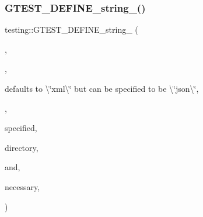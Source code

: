 \subsubsection{\texorpdfstring{GTEST\_DEFINE\_string\_()}{GTEST\_DEFINE\_string\_()}\hspace{0.1cm}{\footnotesize\ttfamily [4/5]}}
{\footnotesize\ttfamily testing\+::\+G\+T\+E\+S\+T\+\_\+\+D\+E\+F\+I\+N\+E\+\_\+string\+\_\+ (\begin{DoxyParamCaption}\item[{output}]{,  }\item[{\mbox{\hyperlink{namespacetesting_1_1internal_a7ed785df46a339403b0f749d3a879201}{internal\+::\+String\+From\+G\+Test\+Env}}(\char`\"{}output\char`\"{}, internal\+::\+Output\+Flag\+Also\+Check\+Env\+Var().c\+\_\+str())}]{,  }\item[{\char`\"{}A format }]{defaults to \textbackslash{}\char`\"{}xml\textbackslash{}\char`\"{} but can be specified to be \textbackslash{}\char`\"{}json\textbackslash{}\char`\"{},  }\item[{\char`\"{} \char`\"{}optionally followed by a colon and an output file name or directory. \char`\"{} \char`\"{}A directory is indicated by a trailing pathname separator. \char`\"{} \char`\"{}Examples\+:\textbackslash{}\char`\"{}xml\+:filename.\+xml\textbackslash{}\char`\"{}}]{,  }\item[{\textbackslash{}\char`\"{}xml\+::directoryname/\textbackslash{}\char`\"{}. \char`\"{} \char`\"{}If a directory is}]{specified,  }\item[{output files will be created \char`\"{} \char`\"{}within that}]{directory,  }\item[{with file-\/names based on the test \char`\"{} \char`\"{}executable \textquotesingle{}s name}]{and,  }\item[{if}]{necessary,  }\item[{made unique by adding \char`\"{} \char`\"{}digits.\char`\"{}}]{ }\end{DoxyParamCaption})}

\mbox{\label{namespacetesting_a5cfe9778e1cc8b5cf04bfe9e764ddff6}} 
